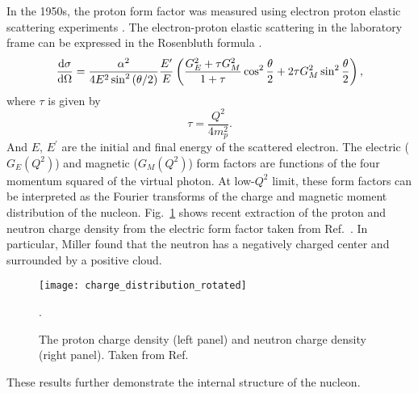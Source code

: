 \documentclass[../main.tex]{subfiles}
\begin{document}
In the 1950s, the proton form factor was measured using electron proton elastic
scattering experiments \cite{hofstadter1956}. The electron-proton elastic 
scattering in the laboratory frame can be expressed in the Rosenbluth formula 
\cite{rosenbluth1950}.
\begin{equation}
\dv{\sigma}{\Omega} = \frac{\alpha^2}{4E^2 \sin^2\left(\theta/2\right)} 
	\frac{E^\prime}{E} \left( \frac{G_E^2+\tau G_M^2}{1+\tau} \cos^2 
	\frac{\theta}{2} + 2\tau G_M^2 \sin^2 \frac{\theta}{2}\right)
	\label{eq:ep_cs},
\end{equation}
where $\tau$ is given by
\begin{equation}
\tau = \frac{Q^2}{4m_p^2}.
\end{equation}
And $E$, $E^\prime$ are the initial and final energy of the scattered electron.
The electric ($G_E\left(Q^2\right)$) and magnetic ($G_M\left(Q^2\right)$) form
factors are functions of the four momentum squared of the virtual photon. At 
low-$Q^2$ limit, these form factors can be interpreted as the Fourier transforms
of the charge and magnetic moment distribution of the nucleon. Fig.\ \ref{fig:charge}
shows recent extraction of the proton and neutron charge density from the electric
form factor taken from Ref.\ \cite{miller2007}. In particular, Miller found that
the neutron has a negatively charged center and surrounded by a positive cloud. 
\begin{figure}[htbp!]
    \centering
    \texttt{[image: charge\_distribution\_rotated]}
    \caption{The proton charge density (left panel) and neutron charge density
	(right panel). Taken from Ref.\ \cite{miller2007}}.
    \label{fig:charge}
\end{figure}
These results further demonstrate the internal structure of the nucleon.
\end{document}
